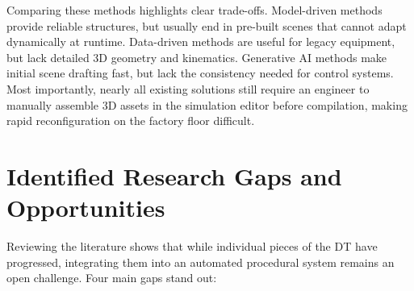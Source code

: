 Comparing these methods highlights clear trade-offs. Model-driven methods \cite{Alexopoulos2025,Schaper2025} provide reliable structures, but usually end in pre-built scenes that cannot adapt dynamically at runtime. Data-driven methods \cite{Lugaresi2021,Garcia2023} are useful for legacy equipment, but lack detailed 3D geometry and kinematics. Generative \gls{AI} methods \cite{Dong2024} make initial scene drafting fast, but lack the consistency needed for control systems. Most importantly, nearly all existing solutions still require an engineer to manually assemble 3D assets in the simulation editor before compilation, making rapid reconfiguration on the factory floor difficult.

\section{Identified Research Gaps and Opportunities}
\label{sec:sota_gaps}

Reviewing the literature shows that while individual pieces of the \gls{DT} have progressed, integrating them into an automated procedural system remains an open challenge. Four main gaps stand out:

